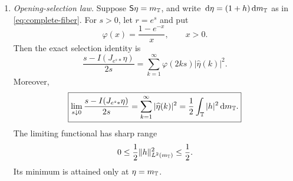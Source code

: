 \begin{theorem}
\begin{enumerate}[label=\textup{(\alph*)},leftmargin=*]
\item \emph{Opening-selection law.}  Suppose
\(\mathsf S\eta=m_{\mathbb{T}}\), and write
\(\,\mathrm{d}\eta=(1+h)\,\mathrm{d} m_{\mathbb{T}}\) as in
\eqref{eq:complete-fiber}.  For \(s>0\), let \(r=e^s\) and put
\[
 \varphi(x)=\frac{1-e^{-x}}{x},\qquad x>0.
\]
Then the exact selection identity is
\begin{equation}\label{eq:exact-selection}
 \frac{s-I(J_{e^s\ast}\eta)}{2s}
 =\sum_{k=1}^{\infty}\varphi(2ks)
 |\widehat\eta(k)|^2.
\end{equation}
Moreover,
\begin{equation}\label{eq:selection-limit}
 \boxed{
 \lim_{s\downarrow0}
 \frac{s-I(J_{e^s\ast}\eta)}{2s}
 =\sum_{k=1}^{\infty}|\widehat\eta(k)|^2
 =\frac12\int_{\mathbb{T}}|h|^2\,\mathrm{d} m_{\mathbb{T}}.}
\end{equation}
The limiting functional has sharp range
\begin{equation}\label{eq:selection-range}
 0\leq\frac12\|h\|_{L^2(m_{\mathbb{T}})}^2\leq\frac12.
\end{equation}
Its minimum is attained only at \(\eta=m_{\mathbb{T}}\).
\end{enumerate}
\end{theorem}

